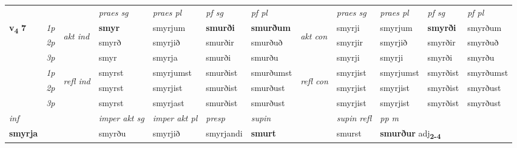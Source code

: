 \begin{longtable}[l]{X>{\footnotesize\itshape}llXXXXlXXXX}
 & &   & \textit{praes sg}  & \textit{praes pl}    & \textit{ pf sg} & \textit{pf pl} & & \textit{praes sg}  & \textit{praes pl}    & \textit{pf sg} & \textit{pf pl }  \\ \cmidrule{4-7} \cmidrule{9-12}
 \multirow{2}{*}{{{\textbf{v{\textsubscript{4}}} \Large{\textbf{7}}}}}  & 1p & \multirow{3}{*}{\begin{turn}{90}\textit{akt ind}\end{turn}} & \textbf{smyr} & smyrjum & \textbf{smurði} & \textbf{smurðum} & \multirow{3}{*}{\begin{turn}{90}\textit{akt con}\end{turn}} &smyrji & smyrjum & \textbf{smyrði} & smyrðum\\*
 & 2p &  &  smyrð  & smyrjið & smurðir & smurðuð & & smyrjir & smyrjið & smyrðir & smyrðuð \\*
 & 3p &  & smyr & smyrja & smurði & smurðu & & smyrji & smyrji& smyrði & smyrðu \\*
\cmidrule{4-7} \cmidrule{9-12}
 & 1p & \multirow{3}{*}{\begin{turn}{90}\textit{refl ind}\end{turn}}  & smyrst & smyrjumst & smurðist & smurðumst & \multirow{3}{*}{\begin{turn}{90}\textit{refl con}\end{turn}}  &smyrjist & smyrjumst & smyrðist & smyrðumst \\*
 & 2p &  & smyrst & smyrjist & smurðist & smurðust & &smyrjist & smyrjist & smyrðist & smyrðust \\*
 & 3p  & & smyrst & smyrjast & smurðist & smurðust & & smyrjist & smyrjist& smyrðist & smyrðust \\*
\cmidrule{4-7} \cmidrule{9-12}

   {\textit{inf}} & &  & \textit{imper akt sg} & \textit{imper akt pl}   & \textit{presp} & \textit{supin} && \textit{supin refl} & \textit{pp m} \\*
  {\textbf{smyrja}} & && smyrðu  & smyrjið   & smyrjandi &  \textbf{smurt} && smurst & \multicolumn{2}{l}{\textbf{smurður} adj\textbf{\textsubscript{2-4}}} \\*

\midrule


\end{longtable}
